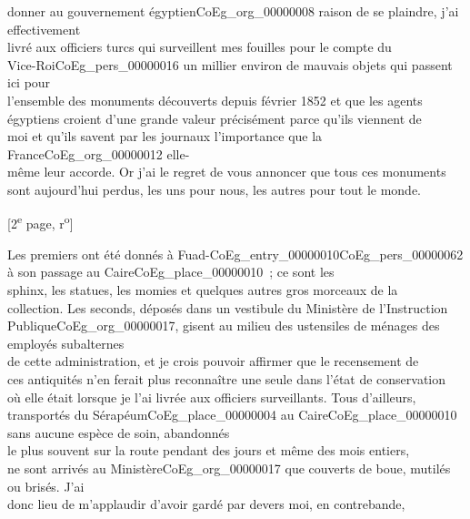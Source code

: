 \documentclass{book}
\begin{document}
donner au gouvernement égyptien\gls{CoEg_org_00000008} raison de se plaindre, j’ai effectivement\\
livré aux officiers turcs qui surveillent mes fouilles pour le compte du\\
Vice-Roi\gls{CoEg_pers_00000016} un millier environ de mauvais objets qui passent ici pour\\
l’ensemble des monuments découverts depuis février 1852 et que les agents\\
égyptiens croient d’une grande valeur précisément parce qu’ils viennent de\\
moi et qu’ils savent par les journaux l’importance que la France\gls{CoEg_org_00000012} elle-\\
même leur accorde. Or j’ai le regret de vous annoncer que tous ces monuments\\
sont aujourd’hui perdus, les uns pour nous, les autres pour tout le monde.
{\footnotesize\begin{center} {[2\textsuperscript{e} page, r\textsuperscript{o}]}\end{center}}
\noindent Les premiers ont été donnés à Fuad-\gls{CoEg_entry_00000010}\gls{CoEg_pers_00000062} à son passage au Caire\gls{CoEg_place_00000010}~; ce sont les\\
sphinx, les statues, les momies et quelques autres gros morceaux de la\\
collection. Les seconds, déposés dans un vestibule du Ministère de l’Instruction\\
Publique\gls{CoEg_org_00000017}, gisent au milieu des ustensiles de ménages des employés subalternes\\
de cette administration, et je crois pouvoir affirmer que le recensement de\\
ces antiquités n’en ferait plus reconnaître une seule dans l’état de conservation\\
où elle était lorsque je l’ai livrée aux officiers surveillants. Tous d’ailleurs,\\
transportés du Sérapéum\gls{CoEg_place_00000004} au Caire\gls{CoEg_place_00000010} sans aucune espèce de soin, abandonnés\\
le plus souvent sur la route pendant des jours et même des mois entiers,\\
ne sont arrivés au Ministère\gls{CoEg_org_00000017} que couverts de boue, mutilés ou brisés. J’ai\\
donc lieu de m’applaudir d’avoir gardé par devers moi, en contrebande,\\
\end{document}
